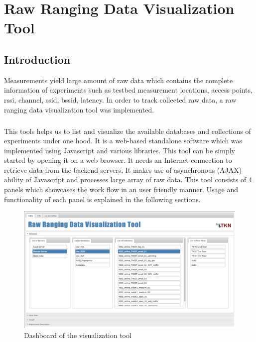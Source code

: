 \documentclass[11pt,a4paper,headinclude,footinclude,chapterprefix=on]{scrreprt}
\begin{document}
\chapter{Raw Ranging Data Visualization Tool}
\section*{Introduction} 
Measurements yield large amount of raw data which contains the complete information of experiments such as testbed measurement locations, access points, rssi, channel, ssid, bssid, latency. In order to track collected raw data, a raw ranging data visualization tool was implemented. 

\paragraph{}This tools helps us to list and visualize the available databases and collections of experiments under one hood. It is a web-based standalone software which was implemented using Javascript and various libraries. This tool can be simply started by opening it on a web browser. It needs an Internet connection to retrieve data from the backend servers. It makes use of asynchronous (AJAX) ability of Javascript and processes large array of raw data. This tool consists of 4 panels which showcases the work flow in an user friendly manner. Usage and functionality of each panel is explained in the following sections.

\begin{figure}
	[!h] \centering 
	\includegraphics[width=15cm]{Images/tool_db.png} \caption{Dashboard of the visualization tool} \label{fig:tool:db} 
\end{figure}
 
\end{document}
